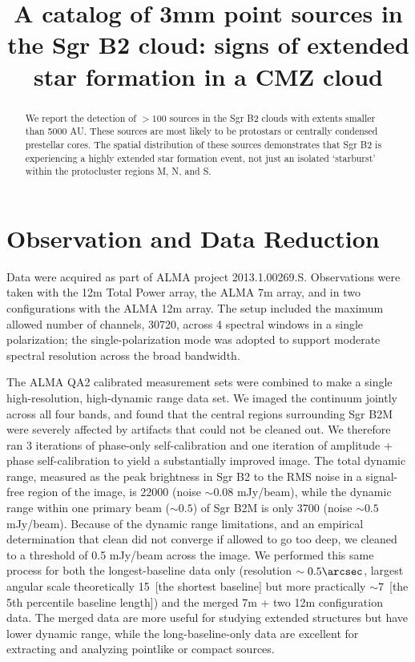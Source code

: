 \documentclass{emulateapj}
\begin{document}
\title{A catalog of 3mm point sources in the Sgr B2 cloud: signs of extended star formation in a CMZ cloud}

\begin{abstract}
We report the detection of $>100$ sources in the Sgr B2 clouds with extents
smaller than 5000 AU.  These sources are most likely to be protostars or
centrally condensed prestellar cores.  The spatial distribution of these sources
demonstrates that Sgr B2 is experiencing a highly extended star formation
event, not just an isolated `starburst' within the protocluster regions M, N,
and S.
\end{abstract}

\ifpdf
\maketitle
\fi



\section{Observation and Data Reduction}
Data were acquired as part of ALMA project 2013.1.00269.S.  Observations were
taken with the 12m Total Power array, the ALMA 7m array, and in two
configurations with the ALMA 12m array.  The setup included the maximum allowed
number of channels, 30720, across 4 spectral windows in a single polarization;
the single-polarization mode was adopted to support moderate spectral resolution
across the broad bandwidth.

The ALMA QA2 calibrated measurement sets were combined to make a single
high-resolution, high-dynamic range data set.  We imaged the continuum jointly
across all four bands, and found that the central regions surrounding Sgr B2M
were severely affected by artifacts that could not be cleaned out.  We
therefore ran 3 iterations of phase-only self-calibration and one iteration of
amplitude + phase self-calibration to yield a substantially improved image.
The total dynamic range, measured as the peak brightness in Sgr B2 to the RMS
noise in a signal-free region of the image, is 22000 (noise $\sim0.08$
mJy/beam), while the dynamic range within one primary beam ($\sim0.5$\arcmin)
of Sgr B2M is only 3700 (noise $\sim0.5$ mJy/beam).  Because of the dynamic
range limitations, and an empirical determination that clean did not converge
if allowed to go too deep, we cleaned to a threshold of 0.5 mJy/beam across the
image.  We performed this same process for both the longest-baseline data only
(resolution $\sim0.5\arcsec$, largest angular scale theoretically 15\arcsec\
[the shortest baseline] but more practically $\sim7$\arcsec\ [the 5th percentile
baseline length]) and the merged 7m + two 12m configuration data.  The merged
data are more useful for studying extended structures but have lower dynamic
range, while the long-baseline-only data are excellent for extracting and
analyzing pointlike or compact sources.
\end{document}
